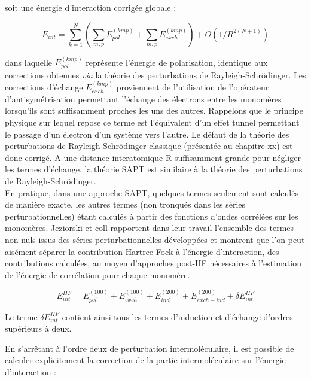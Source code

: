 	soit une énergie d’interaction corrigée globale :
	
	\begin{equation}
	E_{int} = \sum_{k=1}^{N} ( \sum_{m,p} E_{pol}^{(kmp)} + \sum_{m,p} E_{exch}^{(kmp)} ) + O(1/R^{2 (N+1)})
	\end{equation}
	
	\noindent dans laquelle $E_{pol}^{(kmp)}$ représente l'énergie de polarisation, identique aux corrections obtenues \textit{via} la théorie des perturbations de Rayleigh-Schr\"{o}dinger. Les corrections d'échange $E_{exch}^{(kmp)}$ proviennent de l'utilisation de l'opérateur d'antisymétrisation permettant l'échange des électrons entre les monomères lorsqu'ils sont suffisamment proches les uns des autres. Rappelons que le principe physique sur lequel repose ce terme est l'équivalent d'un effet tunnel permettant le passage d’un électron d’un système vers l’autre. Le défaut de la théorie des perturbations de Rayleigh-Schr\"{o}dinger classique (présentée au chapitre xx) est donc corrigé. A une distance interatomique R suffisamment grande pour négliger les termes d'échange, la théorie SAPT est similaire à la théorie des perturbations de Rayleigh-Schr\"{o}dinger.\\
	
	En pratique, dans une approche SAPT, quelques termes seulement sont calculés de manière exacte, les autres termes (non tronqués dans les séries perturbationnelles) étant calculés à partir des fonctions d’ondes corrélées sur les monomères. Jeziorski et coll rapportent dans leur travail l’ensemble des termes non nuls issus des séries perturbationnelles développées et montrent que l’on peut aisément séparer la contribution Hartree-Fock à l’énergie d’interaction, des contributions calculées, au moyen d’approches post-HF nécessaires à l’estimation de l’énergie de corrélation pour chaque monomère. 
	
	\begin{equation}
	E_{int}^{HF} =  E_{pol}^{(100)} + E_{exch}^{(100)} + E_{ind}^{(200)} + E_{exch-ind}^{(200)} + \delta E_{int}^{HF}
	\end{equation}
	
	Le terme $\delta E_{int}^{HF}$ contient ainsi tous les termes d'induction et d'échange d’ordres supérieurs à deux.
	
	En s’arrêtant à l’ordre deux de perturbation intermoléculaire, il est possible de calculer explicitement la correction de la partie intermoléculaire sur l’énergie d’interaction :
	
